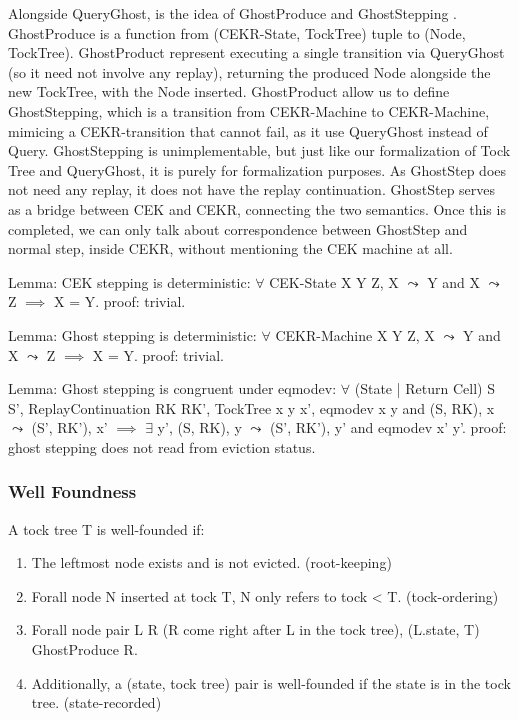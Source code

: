 Alongside QueryGhost, is the idea of GhostProduce and GhostStepping . GhostProduce is a function from (CEKR-State, TockTree) tuple to (Node, TockTree). GhostProduct represent executing a single transition via QueryGhost (so it need not involve any replay), returning the produced Node alongside the new TockTree, with the Node inserted. GhostProduct allow us to define GhostStepping, which is a transition from CEKR-Machine to CEKR-Machine, mimicing a CEKR-transition that cannot fail, as it use QueryGhost instead of Query. GhostStepping is unimplementable, but just like our formalization of Tock Tree and QueryGhost, it is purely for formalization purposes. As GhostStep does not need any replay, it does not have the replay continuation. GhostStep serves as a bridge between CEK and CEKR, connecting the two semantics. Once this is completed, we can only talk about correspondence between GhostStep and normal step, inside CEKR, without mentioning the CEK machine at all.

Lemma: CEK stepping is deterministic: $\forall$ CEK-State X Y Z, X $\leadsto$ Y and X $\leadsto$ Z $\implies$ X = Y.
proof: trivial.

Lemma: Ghost stepping is deterministic: $\forall$ CEKR-Machine X Y Z, X $\leadsto$ Y and X $\leadsto$ Z $\implies$ X = Y.
proof: trivial.

Lemma: Ghost stepping is congruent under eqmodev: $\forall$ (State | Return Cell) S S', ReplayContinuation RK RK', TockTree x y x', eqmodev x y and (S, RK), x $\leadsto$ (S', RK'), x' $\implies$ $\exists$ y', (S, RK), y $\leadsto$ (S', RK'), y' and eqmodev x' y'.
proof: ghost stepping does not read from eviction status.

\subsubsection{Well Foundness}
A tock tree T is well-founded if:
\begin{enumerate}
    \item The leftmost node exists and is not evicted. (root-keeping)
    \item Forall node N inserted at tock T, N only refers to tock < T. (tock-ordering)
    \item Forall node pair L R (R come right after L in the tock tree), (L.state, T) GhostProduce R.
    \item Additionally, a (state, tock tree) pair is well-founded if the state is in the tock tree. (state-recorded)
\end{enumerate}

